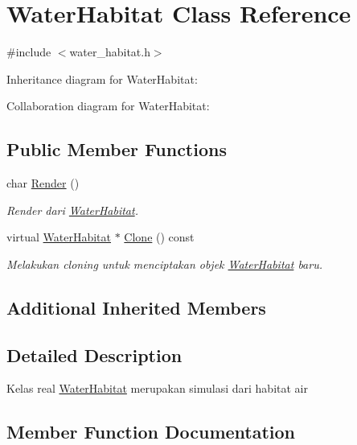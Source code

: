 \hypertarget{classWaterHabitat}{}\section{Water\+Habitat Class Reference}
\label{classWaterHabitat}


{\ttfamily \#include $<$water\+\_\+habitat.\+h$>$}



Inheritance diagram for Water\+Habitat\+:


Collaboration diagram for Water\+Habitat\+:
\subsection*{Public Member Functions}
\begin{DoxyCompactItemize}
\item 
char \hyperlink{classWaterHabitat_a014ef4d2a9e5f37ac70a61d3f060b983}{Render} ()
\begin{DoxyCompactList}\small\item\em Render dari \hyperlink{classWaterHabitat}{Water\+Habitat}. \end{DoxyCompactList}\item 
virtual \hyperlink{classWaterHabitat}{Water\+Habitat} $\ast$ \hyperlink{classWaterHabitat_a6ae8f71f1b999dd7802acd1f5fb71bea}{Clone} () const 
\begin{DoxyCompactList}\small\item\em Melakukan cloning untuk menciptakan objek \hyperlink{classWaterHabitat}{Water\+Habitat} baru. \end{DoxyCompactList}\end{DoxyCompactItemize}
\subsection*{Additional Inherited Members}


\subsection{Detailed Description}
Kelas real \hyperlink{classWaterHabitat}{Water\+Habitat} merupakan simulasi dari habitat air 

\subsection{Member Function Documentation}
